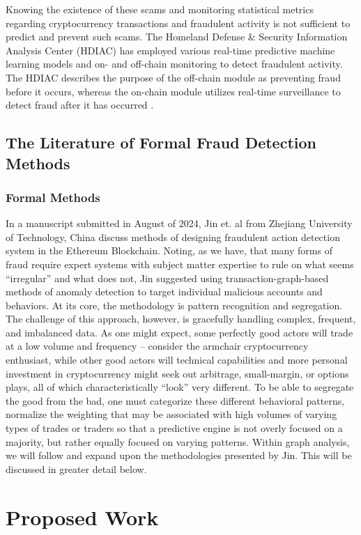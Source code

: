 \documentclass[sigconf]{acmart}
\begin{document}
Knowing the existence of these scams and monitoring statistical metrics regarding cryptocurrency transactions and fraudulent activity is not sufficient to predict and prevent such scams. The Homeland Defense \& Security Information Analysis Center (HDIAC) has employed various real-time predictive machine learning models and on- and off-chain monitoring to detect fraudulent activity. The HDIAC describes the purpose of the off-chain module as preventing fraud before it occurs, whereas the on-chain module utilizes real-time surveillance to detect fraud after it has occurred \cite{HDIAC2023}.
\subsection{The Literature of Formal Fraud Detection Methods}
\subsubsection{Formal Methods}
In a manuscript submitted in August of 2024, Jin et. al from Zhejiang University of Technology, China discuss methods of designing fraudulent action detection system in the Ethereum Blockchain. Noting, as we have, that many forms of fraud require expert systems with subject matter expertise to rule on what seems “irregular” and what does not, Jin suggested using transaction-graph-based methods of anomaly detection to target individual malicious accounts and behaviors. At its core, the methodology is pattern recognition and segregation. The challenge of this approach, however, is gracefully handling complex, frequent, and imbalanced data. As one might expect, some perfectly good actors will trade at a low volume and frequency – consider the armchair cryptocurrency enthusiast, while other good actors will technical capabilities and more personal investment in cryptocurrency might seek out arbitrage, small-margin, or options plays, all of which characteristically “look” very different. To be able to segregate the good from the bad, one must categorize these different behavioral patterns, normalize the weighting that may be associated with high volumes of varying types of trades or traders so that a predictive engine is not overly focused on a majority, but rather equally focused on varying patterns.
Within graph analysis, we will follow and expand upon the methodologies presented by Jin. This will be discussed in greater detail below.
\cite{EnhancingEthereumFraudDetection}

\section{Proposed Work}
\end{document}
